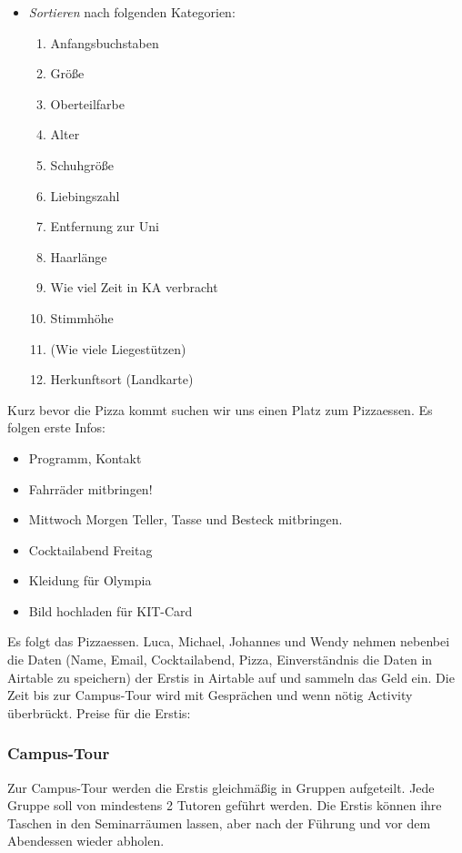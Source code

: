 \documentclass[10pt,twocolumn,ngerman]{scrartcl}
\begin{document}
\begin{itemize}
    \item \emph{Sortieren} nach folgenden Kategorien:
        \begin{enumerate}
            \item Anfangsbuchstaben
            \item Größe
            \item Oberteilfarbe
            \item Alter
            \item Schuhgröße
            \item Liebingszahl
            \item Entfernung zur Uni
            \item Haarlänge
            \item Wie viel Zeit in KA verbracht
            \item Stimmhöhe
            \item (Wie viele Liegestützen)
            \item Herkunftsort (Landkarte)
        \end{enumerate}
\end{itemize}

Kurz bevor die Pizza kommt suchen wir uns einen Platz zum Pizzaessen.
Es folgen erste Infos:
\begin{itemize}
    \item Programm, Kontakt
    \item Fahrräder mitbringen!
    \item Mittwoch Morgen Teller, Tasse und Besteck mitbringen.
    \item Cocktailabend Freitag
    \item Kleidung für Olympia
    \item Bild hochladen für KIT-Card
\end{itemize}
Es folgt das Pizzaessen. Luca, Michael, Johannes und Wendy nehmen
nebenbei die Daten (Name, Email, Cocktailabend, Pizza, Einverständnis
die Daten in Airtable zu speichern) der Erstis in Airtable auf und
sammeln das Geld ein. Die Zeit bis zur Campus-Tour wird mit Gesprächen
und wenn nötig Activity überbrückt. Preise für die Erstis:


\subsubsection{Campus-Tour}

Zur Campus-Tour werden die Erstis gleichmäßig in Gruppen aufgeteilt.
Jede Gruppe soll von mindestens 2 Tutoren geführt werden. Die Erstis
können ihre Taschen in den Seminarräumen lassen, aber nach der Führung
und vor dem Abendessen wieder abholen.
\end{document}
